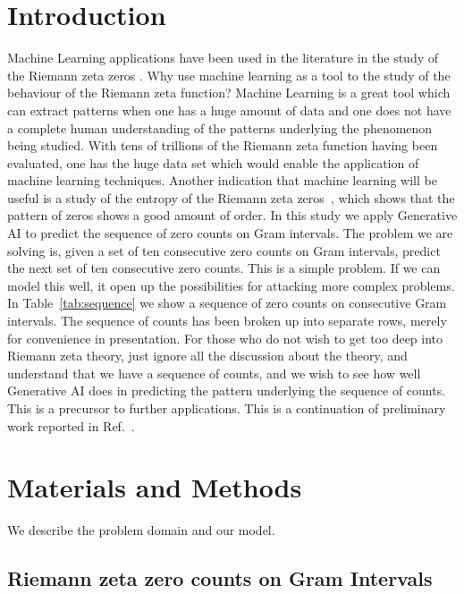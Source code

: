 \documentclass[twoside]{article}
\begin{document}
\section{Introduction}

 Machine Learning applications have been used in the literature in the study of the Riemann zeta zeros \cite{osneural,Shanker 2018a,osentropy}.
Why use machine learning  as a tool to the study of the behaviour of the Riemann zeta function?  Machine Learning is a great tool which can extract patterns when one has a huge amount of data and one does not have a complete human understanding of the patterns underlying the phenomenon being studied. With tens of trillions of the Riemann zeta function having been evaluated, one has the huge data set which would enable the application of machine learning techniques. Another indication that machine learning will be useful is a study of the entropy of the Riemann zeta zeros~\cite{osentropy}, which shows that the pattern of zeros shows a good amount of order. In this study we apply Generative AI to predict the sequence of zero counts on Gram intervals. The problem we are solving is, given a set of ten consecutive zero counts on Gram intervals, predict the next set of ten consecutive zero counts. This is a simple problem. If we can model this well, it open up the possibilities for attacking more complex problems. In Table~\ref{tab:sequence} we show a sequence of zero counts on consecutive Gram intervals. The sequence of counts has been broken up into separate rows, merely for convenience in presentation. For those who do not wish to get too deep into Riemann zeta theory, just ignore all the discussion about the theory, and understand that we have a sequence of counts, and we wish to see how well Generative AI does in predicting the pattern underlying the sequence of counts. This is a precursor to further applications. This is a continuation of preliminary work reported in Ref.~\cite{osgenai}.


\section{\label{sec2}Materials and Methods}
We describe the problem domain and our model.

\subsection{\label{seckaratsuba}Riemann zeta zero counts on Gram Intervals}
\end{document}
